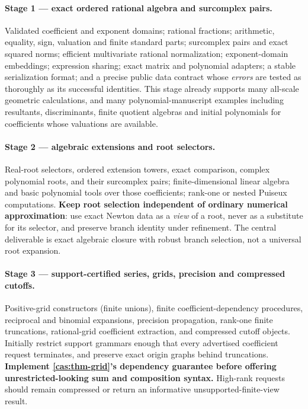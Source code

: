 \documentclass[11pt,letterpaper]{article}
\numberwithin{equation}{section}
\theoremstyle{definition}
\theoremstyle{remark}
\begin{document}
\paragraph{Stage 1 --- exact ordered rational algebra and surcomplex pairs.}
Validated coefficient and exponent domains; rational fractions; arithmetic,
equality, sign, valuation and finite standard parts; surcomplex pairs and exact
squared norms; efficient multivariate rational normalization; exponent-domain
embeddings; expression sharing; exact matrix and polynomial adapters; a stable
serialization format; and a precise public data contract whose \emph{errors} are
tested as thoroughly as its successful identities. This stage already supports
many all-scale geometric calculations, and many polynomial-manuscript examples
including resultants, discriminants, finite quotient algebras and initial
polynomials for coefficients whose valuations are available.

\paragraph{Stage 2 --- algebraic extensions and root selectors.}
Real-root selectors, ordered extension towers, exact comparison, complex
polynomial roots, and their surcomplex pairs; finite-dimensional linear algebra
and basic polynomial tools over those coefficients; rank-one or nested Puiseux
computations. \textbf{Keep root selection independent of ordinary numerical
approximation}: use exact Newton data as a \emph{view} of a root, never as a
substitute for its selector, and preserve branch identity under refinement. The
central deliverable is exact algebraic closure with robust branch selection, not
a universal root expansion.

\paragraph{Stage 3 --- support-certified series, grids, precision and compressed cutoffs.}
Positive-grid constructors (finite unions), finite coefficient-dependency
procedures, reciprocal and binomial expansions, precision propagation,
rank-one finite truncations, rational-grid coefficient extraction, and
compressed cutoff objects. Initially restrict support grammars enough that every
advertised coefficient request terminates, and preserve exact origin graphs
behind truncations. \textbf{Implement \cref{cas:thm-grid}'s dependency guarantee
before offering unrestricted-looking sum and composition syntax.} High-rank
requests should remain compressed or return an informative
unsupported-finite-view result.
\end{document}
